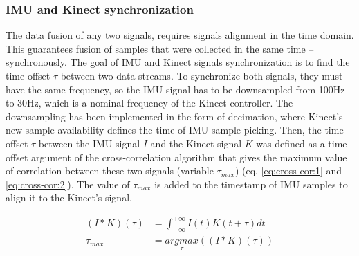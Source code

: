 \documentclass[sensors,article,submit,moreauthors,pdftex,10pt,a4paper]{mdpi}
\begin{document}
\subsubsection{IMU and Kinect synchronization}
The data fusion of any two signals, requires signals alignment in the time domain. This guarantees fusion of samples that were collected in the same time -- synchronously. The goal of IMU and Kinect signals synchronization is to find the time offset $\tau$ between two data streams. To synchronize both signals, they must have the same frequency, so the IMU signal has to be downsampled from 100Hz to 30Hz, which is a nominal frequency of the Kinect controller. The downsampling has been implemented in the form of decimation, where Kinect’s new sample availability defines the time of IMU sample picking. Then, the time offset $\tau$ between the IMU signal $I$ and the Kinect signal $K$ was defined as a time offset argument of the cross-correlation algorithm that gives the maximum value of correlation between these two signals (variable $\tau_{max}$) (eq. \ref{eq:cross-cor:1} and \ref{eq:cross-cor:2}). The value of $\tau_{max}$ is added to the timestamp of IMU samples to align it to the Kinect’s signal.
		
\begin{subequations}
	\begin{align}
		(I \ast K)(\tau) & = \int_{-\infty}^{+\infty}I(t)K(t+\tau)dt\label{eq:cross-cor:1}   \\
		\tau_{max}       & = \underset{\tau}{argmax}((I \ast K)(\tau))\label{eq:cross-cor:2} 
	\end{align}
	\label{eq:cross-cor}
\end{subequations}
		
		
		
\end{document}
